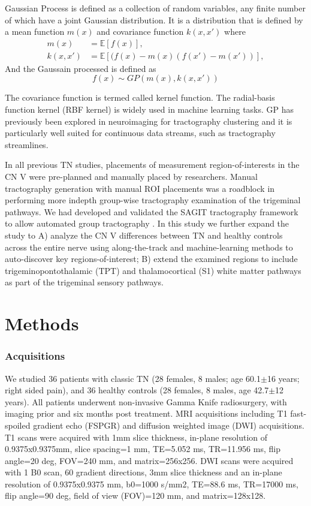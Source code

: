 Gaussian Process is defined \cite{rasmussen2006gaussian} as a collection of random variables, any finite number of which have a joint Gaussian distribution. 
It is a distribution that is defined by a mean function $m(x)$ and covariance function $k(x,x') $ where
\begin{equation}
	\begin{split}
		m(x) &= \mathbb{E}[f(x)], \\
		k(x,x') &= \mathbb{E}[(f(x)-m(x)(f(x')-m(x'))],
	\end{split}
\end{equation}
And the Gaussain processed is defined as
\begin{equation}
f(x) \sim GP(m(x), k(x, x')) 
\end{equation}

The covariance function is termed called kernel function. The radial-basis function kernel (RBF kernel) is widely used in machine learning tasks. GP has previously been explored in neuroimaging for tractography clustering \cite{Wassermann2010} and it is particularly well suited for continuous data streams, such as tractography streamlines.

In all previous TN studies, placements of measurement region-of-interests in the CN V were pre-planned and manually placed by researchers. Manual tractography generation with manual ROI placements was a roadblock in performing more indepth group-wise tractography examination of the trigeminal pathways. We had developed and validated the SAGIT tractography framework to allow automated group tractography \cite{Chen2016}. In this study we further expand the study to A) analyze the CN V differences between TN and healthy controls across the entire nerve using along-the-track and machine-learning methods to auto-discover key regions-of-interest; B) extend the examined regions to include trigeminopontothalamic (TPT) and thalamocortical (S1) white matter pathways as part of the trigeminal sensory pathways.

\section{Methods}
\subsubsection{Acquisitions}
We studied 36 patients with classic TN (28 females, 8 males; age 60.1$\pm$16 years; right sided pain), and 36 healthy controls (28 females, 8 males, age 42.7$\pm$12 years).  All patients underwent non-invasive Gamma Knife radiosurgery, with imaging prior and six months post treatment. MRI acquisitions including T1 fast-spoiled gradient echo (FSPGR) and diffusion weighted image (DWI) acquisitions. T1 scans were acquired with 1mm slice thickness, in-plane resolution of 0.9375x0.9375mm, slice spacing=1 mm, TE=5.052 ms, TR=11.956 ms, flip angle=20 deg, FOV=240 mm, and matrix=256x256. DWI scans were acquired with 1 B0 scan, 60 gradient directions, 3mm slice thickness and an in-plane resolution of 0.9375x0.9375 mm, b0=1000 s/mm2, TE=88.6 ms, TR=17000 ms, flip angle=90 deg, field of view (FOV)=120 mm, and matrix=128x128.

